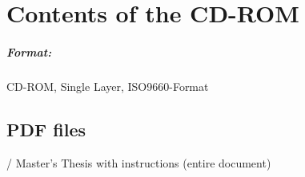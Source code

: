\chapter{Contents of the CD-ROM}
\label{app:cdrom}

\paragraph{Format:}
		CD-ROM, Single Layer, ISO9660-Format%


\section{PDF files}
\begin{FileList}{/}
 Master's Thesis with instructions (entire document)%
\end{FileList}

